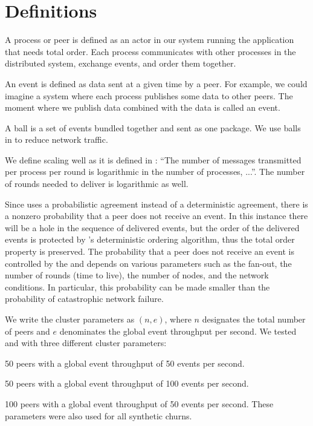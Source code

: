 \section{Definitions}
\label{sec:definitions}
A process or peer is defined as an actor in our system running the application that needs total order. Each process communicates with other processes in the distributed system, exchange events, and order them together. 
\par
An event is defined as data sent at a given time by a peer. For example, we could imagine a system where each process publishes some data to other peers. The moment where we publish data combined with the data is called an event. 
\par
A ball is a set of events bundled together and sent as one package. We use balls in \epto to reduce network traffic. 

We define \epto scaling well as it is defined in  \autocite{matos2015epto}:  ``The number
of messages transmitted per process per round is logarithmic
in the number of processes, ...''. The number of rounds needed to deliver is logarithmic as well. 
\par
Since \epto uses a probabilistic agreement instead of a deterministic agreement, there is a nonzero probability that a peer does not receive an event. In this instance there will be a hole in the sequence of delivered events, but the order of the delivered events is protected by \epto's deterministic ordering algorithm, thus the total order property is preserved. The probability that a peer does not receive an event is controlled by the \epto and depends on various parameters such as the fan-out, the number of rounds (time to live), the number of nodes, and the network conditions. In particular, this probability can be made smaller than the probability of catastrophic network failure. 
\par
We write the cluster parameters as $(n,e)$, where $n$ designates the total number of peers and $e$ denominates the global event throughput per second. We tested \epto and \jgroups with three different cluster parameters:
\begin{description}[\IEEEsetlabelwidth{$(100,100)$:}]
	\item[\textbf{$(50,50)$}:] 50 peers with a global event throughput of 50 events per second.
	\item[\textbf{$(50,100)$}:] 50 peers with a global event throughput of 100 events per second.
	\item[\textbf{$(100,50)$}:] 100 peers with a global event throughput of 50 events per second. These parameters were also used for all synthetic churns.
\end{description}
